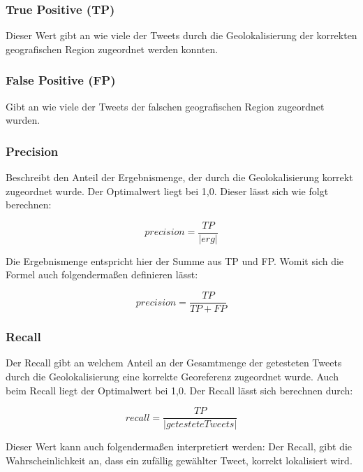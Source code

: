 			\subsubsection{True Positive (TP)}

				Dieser Wert gibt an wie viele der Tweets durch die Geolokalisierung der korrekten geografischen Region zugeordnet werden konnten.
				
			\subsubsection{False Positive (FP)}

				Gibt an wie viele der Tweets der falschen geografischen Region zugeordnet wurden.  

			\subsubsection{Precision}  

				Beschreibt den Anteil der Ergebnismenge, der durch die Geolokalisierung korrekt zugeordnet wurde.
				Der Optimalwert liegt bei 1,0.
				Dieser lässt sich wie folgt berechnen:

				\begin{equation}
					precision=\frac{TP}{|erg|}
				\end{equation}	

				Die Ergebnismenge entspricht hier der Summe aus TP und FP.
				Womit sich die Formel auch folgendermaßen definieren lässt:  

				\begin{equation}
					precision=\frac{TP}{TP+FP}
				\end{equation}		

			\subsubsection{Recall} 

				Der Recall gibt an welchem Anteil an der Gesamtmenge der getesteten Tweets durch die Geolokalisierung eine korrekte Georeferenz zugeordnet wurde.
				Auch beim Recall liegt der Optimalwert bei 1,0.
				Der Recall lässt sich berechnen durch:

				\begin{equation}
					recall=\frac{TP}{|getestete Tweets|}
				\end{equation}	


				Dieser Wert kann auch folgendermaßen interpretiert werden:
				Der Recall, gibt die Wahrscheinlichkeit an, dass ein zufällig gewählter Tweet, korrekt lokalisiert wird. 

